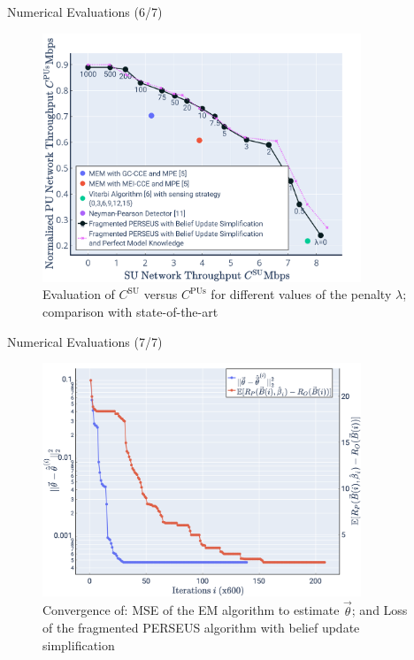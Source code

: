 \documentclass{beamer}
\begin{document}
\begin{frame}{Numerical Evaluations (6/7)}
    \begin{figure}
    \centering
    \includegraphics[width = 0.85\textwidth]{Final.PNG}
    \caption{Evaluation of $C^{\text{SU}}$ versus $C^{\text{PUs}}$ for different values of the penalty $\lambda$; comparison with state-of-the-art}
    \label{fig:34}
\end{figure}
\end{frame}
\begin{frame}{Numerical Evaluations (7/7)}
    \begin{figure}
    \centering
    \includegraphics[width = 0.85\textwidth]{PerseusRegretConvergence_NormSquareErrorConvergence.png}
    \caption{Convergence of: MSE of the EM algorithm to estimate $\vec{\theta}$; and Loss of the fragmented PERSEUS algorithm with belief update simplification}
    \label{fig:35}
\end{figure}
\end{frame}
\end{document}
